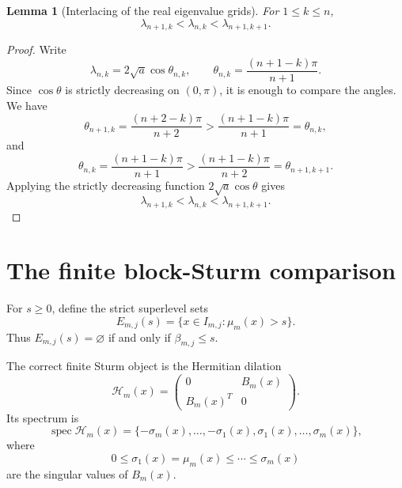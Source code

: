\documentclass[11pt]{amsart}
\numberwithin{equation}{section}
\newtheorem{lemma}[theorem]{Lemma}
\DeclareMathOperator{\spec}{spec}
\begin{document}
\begin{lemma}[Interlacing of the real eigenvalue grids]\label{lem:grid}
For \(1\le k\le n\),
\[
        \lambda_{n+1,k}
        <
        \lambda_{n,k}
        <
        \lambda_{n+1,k+1}.
\]
\end{lemma}

\begin{proof}
Write
\[
        \lambda_{n,k}=2\sqrt a\cos\theta_{n,k},
        \qquad
        \theta_{n,k}=\frac{(n+1-k)\pi}{n+1}.
\]
Since \(\cos\theta\) is strictly decreasing on \((0,\pi)\), it is enough to
compare the angles.  We have
\[
        \theta_{n+1,k}
        =
        \frac{(n+2-k)\pi}{n+2}
        >
        \frac{(n+1-k)\pi}{n+1}
        =
        \theta_{n,k},
\]
and
\[
        \theta_{n,k}
        =
        \frac{(n+1-k)\pi}{n+1}
        >
        \frac{(n+1-k)\pi}{n+2}
        =
        \theta_{n+1,k+1}.
\]
Applying the strictly decreasing function \(2\sqrt a\cos\theta\) gives
\[
        \lambda_{n+1,k}
        <
        \lambda_{n,k}
        <
        \lambda_{n+1,k+1}.
\]
\end{proof}

\section{The finite block-Sturm comparison}

For \(s\ge0\), define the strict superlevel sets
\[
        E_{m,j}(s)
        =
        \{x\in I_{m,j}:\mu_m(x)>s\}.
\]
Thus \(E_{m,j}(s)=\varnothing\) if and only if \(\beta_{m,j}\le s\).

The correct finite Sturm object is the Hermitian
dilation
\[
        \mathcal H_m(x)
        =
        \begin{pmatrix}
        0&B_m(x)\\
        B_m(x)^T&0
        \end{pmatrix}.
\]
Its spectrum is
\[
        \spec\mathcal H_m(x)
        =
        \{-\sigma_m(x),\dots,-\sigma_1(x),
          \sigma_1(x),\dots,\sigma_m(x)\},
\]
where
\[
        0\le \sigma_1(x)=\mu_m(x)\le\cdots\le\sigma_m(x)
\]
are the singular values of \(B_m(x)\).
\end{document}

